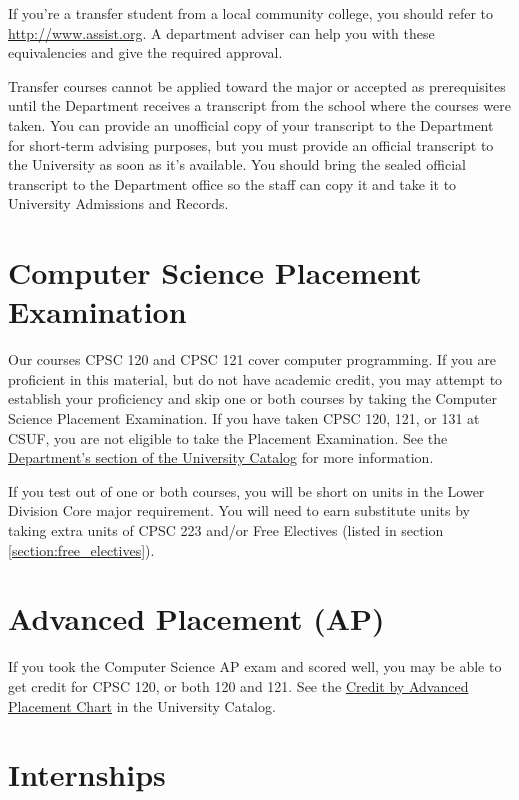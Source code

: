 \documentclass{book}
\newcommand{\campusname}{CSUF}
\begin{document}
If you're a transfer student from a local community college, you should refer to \url{http://www.assist.org}. A department adviser can help you with these equivalencies and give the required approval.

Transfer courses cannot be applied toward the major or accepted as prerequisites until the Department receives a transcript from the school where the courses were taken. You can provide an unofficial copy of your transcript to the Department for short-term advising purposes, but you must provide an official transcript to the University as soon as it's available. You should bring the sealed official transcript to the Department office so the staff can copy it and take it to University Admissions and Records.

\section{Computer Science Placement Examination}
\label{section:placement}
Our courses CPSC 120 and CPSC 121 cover computer programming. If you are proficient in this material, but do not have academic credit, you may attempt to establish your proficiency and skip one or both courses by taking the Computer Science Placement Examination. If you have taken CPSC 120, 121, or 131 at \campusname, you are not eligible to take the Placement Examination. See the \href{http://catalog.fullerton.edu/preview_program.php?catoid=2&poid=537&returnto=137}{Department's section of the University Catalog} for more information.

If you test out of one or both courses, you will be short on units in the Lower Division Core major requirement. You will need to earn substitute units by taking extra units of CPSC 223 and/or Free Electives (listed in section \ref{section:free_electives}).

\section{Advanced Placement (AP)}
\label{section:ap}
If you took the Computer Science AP exam and scored well, you may be able to get credit for CPSC 120, or both 120 and 121. See the \href{http://catalog.fullerton.edu/content.php?catoid=2&navoid=153#Credit%20by%20Advanced%20Placement%20Chart}{Credit by Advanced Placement Chart} in the University Catalog.

\section{Internships}
\end{document}
